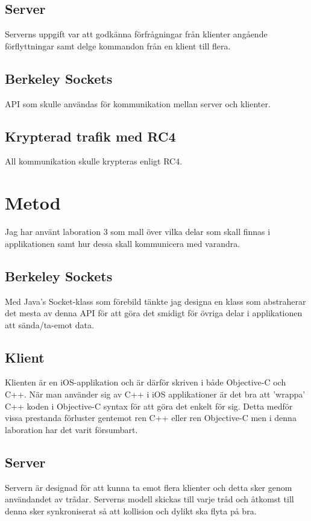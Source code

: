 \documentclass[10pt, titlepage, oneside, a4paper]{article}
\begin{document}
		\subsection{Server}
		Serverns uppgift var att godkänna förfrågningar från klienter angående förflyttningar samt delge kommandon från en klient till flera.
		
		\subsection{Berkeley Sockets}
		API som skulle användas för kommunikation mellan server och klienter.

		\subsection{Krypterad trafik med RC4}
		All kommunikation skulle krypteras enligt RC4.
		 
	

	\newpage	
	\section{Metod}%
	Jag har använt laboration 3 som mall över vilka delar som skall finnas i applikationen samt hur dessa skall kommunicera med varandra. 
	
		\subsection{Berkeley Sockets}	
		Med Java's Socket-klass som förebild tänkte jag designa en klass som abstraherar det mesta av denna API för att göra det smidigt för övriga delar i applikationen att sända/ta-emot data. 
		
		\subsection{Klient} %
		Klienten är en iOS-applikation och är därför skriven i både Objective-C och C++. När man använder sig av C++ i iOS applikationer är det bra att 'wrappa' C++ koden i Objective-C syntax för att göra det enkelt för sig. Detta medför vissa prestanda förluster gentemot ren C++ eller ren Objective-C men i denna laboration har det varit försumbart.
		
		\subsection{Server} %
		Servern är designad för att kunna ta emot flera klienter och detta sker genom användandet av trådar. Serverns modell skickas till varje tråd och åtkomst till denna sker synkroniserat så att kollision och dylikt ska flyta på bra.
				
\end{document}
